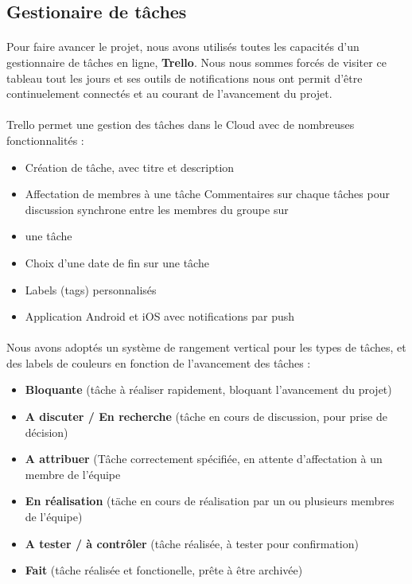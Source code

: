 \subsection{Gestionaire de tâches}

\paragraph{}
Pour faire avancer le projet, nous avons utilisés toutes les capacités d’un gestionnaire de tâches en ligne, \textbf{Trello}. Nous nous sommes forcés de visiter ce tableau tout les jours et ses outils de notifications nous ont permit d’être continuelement connectés et au courant de l’avancement du projet.

\paragraph{}
Trello permet une gestion des tâches dans le Cloud avec de nombreuses fonctionnalités :
\begin{itemize}
\item Création de tâche, avec titre et description
\item Affectation de membres à une tâche
Commentaires sur chaque tâches pour discussion synchrone entre les membres du groupe sur \item une tâche
\item Choix d’une date de fin sur une tâche
\item Labels (tags) personnalisés
\item Application Android et iOS avec notifications par push
\end{itemize}

\paragraph{}
Nous avons adoptés un système de rangement vertical pour les types de tâches, et des labels de couleurs en fonction de l’avancement des tâches :

\begin{itemize}
\item \textbf{Bloquante} (tâche à réaliser rapidement, bloquant l’avancement du projet)
\item \textbf{A discuter / En recherche} (tâche en cours de discussion, pour prise de décision)
\item \textbf{A attribuer} (Tâche correctement spécifiée, en attente d’affectation à un membre de l’équipe
\item \textbf{En réalisation} (täche en cours de réalisation par un ou plusieurs membres de l’équipe)
\item \textbf{A tester / à contrôler} (tâche réalisée, à tester pour confirmation)
\item \textbf{Fait} (tâche réalisée et fonctionelle, prête à être archivée)
\end{itemize}

